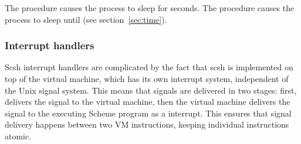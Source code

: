  \undefined
{}\undefined
\begin{desc}
  The  procedure causes the process to sleep for 
  seconds.  The  procedure causes the process to sleep
  until  (see section~\ref{sec:time}).  
  
\end{desc}

\subsubsection{Interrupt handlers}
\label{sec:int_handlers}
Scsh interrupt handlers are complicated by the fact that scsh is implemented on
top of the {\scm} virtual machine, which has its own interrupt system, 
independent of the Unix signal system.
This means that {\Unix} signals are delivered in two stages: first,
{\Unix} delivers the signal to the {\scm} virtual machine, then
the {\scm} virtual machine delivers the signal to the executing Scheme program
as a {\scm} interrupt.
This ensures that signal delivery happens between two VM instructions,
keeping individual instructions atomic.

